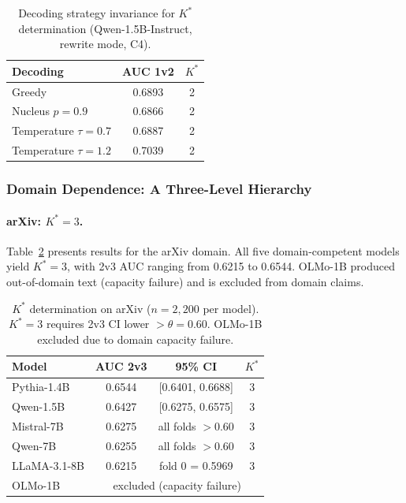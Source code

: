 \documentclass[11pt,a4paper]{article}
\begin{document}
\begin{table}[h]
\centering
\caption{Decoding strategy invariance for $K^*$ determination (Qwen-1.5B-Instruct, rewrite mode, C4).}
\label{tab:decoding}
\small
\begin{tabular}{lcc}
\toprule
\textbf{Decoding} & \textbf{AUC 1v2} & \textbf{$K^*$} \\
\midrule
Greedy & 0.6893 & 2 \\
Nucleus $p=0.9$ & 0.6866 & 2 \\
Temperature $\tau=0.7$ & 0.6887 & 2 \\
Temperature $\tau=1.2$ & 0.7039 & 2 \\
\bottomrule
\end{tabular}
\end{table}

\subsubsection{Domain Dependence: A Three-Level Hierarchy}

\paragraph{arXiv: $K^*=3$.}
Table~\ref{tab:arxiv_kstar} presents results for the arXiv domain. All five domain-competent models yield $K^*=3$, with 2v3 AUC ranging from 0.6215 to 0.6544. OLMo-1B produced out-of-domain text (capacity failure) and is excluded from domain claims.

\begin{table}[h]
\centering
\caption{$K^*$ determination on arXiv ($n=2{,}200$ per model). $K^*=3$ requires 2v3 CI lower $> \theta = 0.60$. OLMo-1B excluded due to domain capacity failure.}
\label{tab:arxiv_kstar}
\small
\begin{tabular}{lccc}
\toprule
\textbf{Model} & \textbf{AUC 2v3} & \textbf{95\% CI} & \textbf{$K^*$} \\
\midrule
Pythia-1.4B & 0.6544 & [0.6401, 0.6688] & 3 \\
Qwen-1.5B & 0.6427 & [0.6275, 0.6575] & 3 \\
Mistral-7B & 0.6275 & all folds $> 0.60$ & 3 \\
Qwen-7B & 0.6255 & all folds $> 0.60$ & 3 \\
LLaMA-3.1-8B & 0.6215 & fold 0 = 0.5969 & 3 \\
\midrule
OLMo-1B & \multicolumn{3}{c}{excluded (capacity failure)} \\
\bottomrule
\end{tabular}
\end{table}
\end{document}
